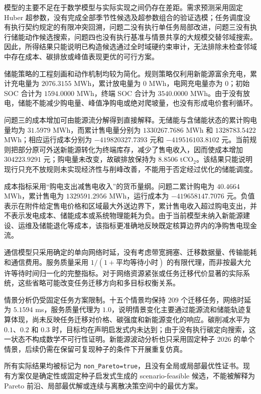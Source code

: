 模型的主要不足在于数学模型与实际实现之间仍存在差距。需求预测采用固定 Huber 超参数，没有完成全部季节性候选及超参数组合的验证选模；任务调度没有执行契约规定的有限冲突回溯，问题二没有执行单任务局部改进，问题三没有执行储能动作候选搜索，问题四也没有执行基准与情景共享的大规模交替邻域搜索。因此，所得结果只能说明已构造候选通过全时域硬约束审计，无法排除未检查邻域中存在成本、碳排放或峰值表现更优的可行方案。

储能策略的工程刻画和动作机制均较为简化。规则策略仅利用新能源富余充电，累计充电量为 $2076.3155$ MWh，累计放电量为 $0$ MWh，电网充电量亦为 $0$；初始 SOC 合计为 $1594.0000$ MWh，终端 SOC 合计为 $3540.0000$ MWh。由于没有放电，储能不能减少购电量、峰值净购电或绝对爬坡量，也没有形成电价套利循环。

问题三的成本增加可由能源流分解得到直接解释。无储能与含储能状态的累计购电量均为 $31.5979$ MWh，而累计售电量分别为 $1330267.7686$ MWh 和 $1328783.5422$ MWh；相应运行成本分别为 $-419820327.7393$ 元和 $-419516103.8102$ 元。当前规则把部分原可外送新能源转化为终端库存，减少了售电收入，因而使成本增加 $304223.9291$ 元；购电量未改变，故碳排放保持为 $8.8506$ tCO$_2$。该结果只能说明现行只充不放规则未实现经济性与削峰改善，不能用于否定经过优化的储能调度。

成本指标采用“购电支出减售电收入”的货币量纲。问题二累计购电为 $40.4664$ MWh，累计售电为 $1329591.2956$ MWh，运行成本为 $-419658147.7076$ 元。负值表示在附件给定售电价格和区域最大外送边界下，累计售电收入超过购电支出，并不表示发电成本、储能成本或系统物理能耗为负。由于当前模型未纳入新能源建设、运维及储能退化等成本，该指标更准确地反映既定核算边界内的净购售电现金流。

通信模型只采用确定的单向网络时延，没有考虑带宽拥塞、迁移数据量、传输能耗和通信费用。服务质量采用 $1/(1+\text{平均等待小时})$ 的有限代理，而非按最大允许等待时间归一化的完整指标。对于网络资源紧张或任务迁移代价显著的实际系统，这些省略可能改变任务迁移方向和多目标权衡关系。

情景分析仍受固定任务方案限制。十五个情景均保持 $209$ 个迁移任务，网络时延为 $5.1594$ ms，服务质量代理为 $1.0$，说明情景变化主要通过能源流和储能轨迹复算体现，尚未反映任务迁移对价格、碳强度和新能源变化的响应。碳削减水平为 $0.1$、$0.2$ 和 $0.3$ 时，目标均在声明启发式内未达到；由于没有执行碳定向搜索，这一状态不构成数学不可行性证明。新能源波动分析也只采用固定种子 $2026$ 的单个情景，后续仍需在保留可复现种子的条件下开展重复仿真。

所有实际结果均被标记为 \texttt{non\_Pareto=true}，且没有全局或局部最优性证书。现有方案仅是确定性或固定种子启发式生成的 scenario-feasible 候选，不能被解释为 Pareto 前沿、局部最优解或连续与离散决策空间中的最优方案。

